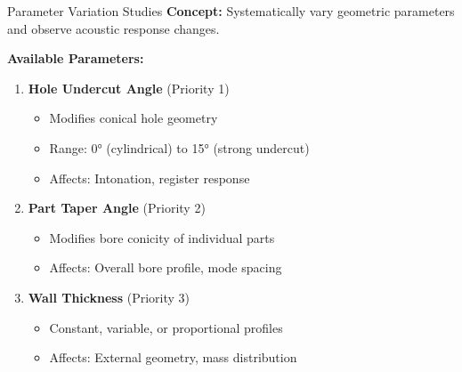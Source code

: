 \documentclass[aspectratio=169,10pt]{beamer}
\begin{document}
\begin{frame}{Parameter Variation Studies}
\textbf{Concept:}
Systematically vary geometric parameters and observe acoustic response changes.

\textbf{Available Parameters:}

\begin{enumerate}
    \item \textbf{Hole Undercut Angle} (Priority 1)
    \begin{itemize}
        \item Modifies conical hole geometry
        \item Range: 0° (cylindrical) to 15° (strong undercut)
        \item Affects: Intonation, register response
    \end{itemize}
    
    \item \textbf{Part Taper Angle} (Priority 2)
    \begin{itemize}
        \item Modifies bore conicity of individual parts
        \item Affects: Overall bore profile, mode spacing
    \end{itemize}
    
    \item \textbf{Wall Thickness} (Priority 3)
    \begin{itemize}
        \item Constant, variable, or proportional profiles
        \item Affects: External geometry, mass distribution
    \end{itemize}
\end{enumerate}
\end{frame}
\end{document}

